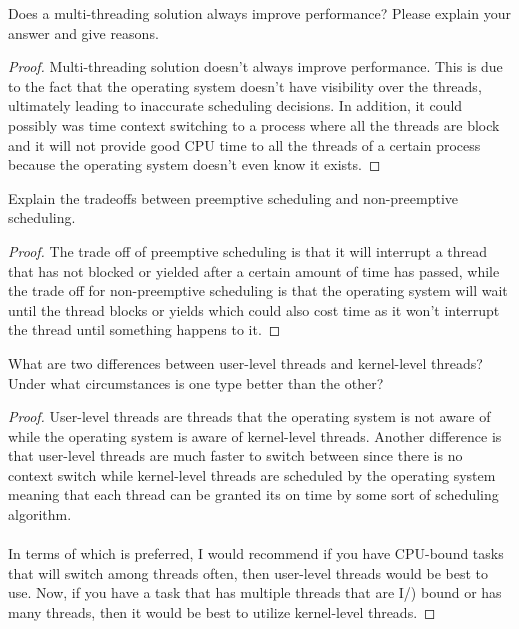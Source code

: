 \documentclass[12pt]{article}
\newenvironment{exercise}[2][Exercise]{\begin{trivlist}
\item[\hskip \labelsep {\bfseries #1}\hskip \labelsep {\bfseries #2.}]}{\end{trivlist}}
\begin{document}
\begin{exercise}{7}
Does a multi-threading solution always improve performance? Please explain your answer and give reasons.
\end{exercise}

\begin{proof}
Multi-threading solution doesn't always improve performance. This is due to the fact that the operating system doesn't have visibility over the threads, ultimately leading to inaccurate scheduling decisions. In addition, it could possibly was time context switching to a process where all the threads are block and it will not provide good CPU time to all the threads of a certain process because the operating system doesn't even know it exists. 
\end{proof}

\begin{exercise}{8}
Explain the tradeoffs between preemptive scheduling and non-preemptive scheduling.
\end{exercise}

\begin{proof}
The trade off of preemptive scheduling is that it will interrupt a thread that has not blocked or yielded after a certain amount of time has passed, while the trade off for non-preemptive scheduling is that the operating system will wait until the thread blocks or yields which could also cost time as it won't interrupt the thread until something happens to it.
\end{proof}

\begin{exercise}{9}
What are two differences between user-level threads and kernel-level threads? Under what circumstances is one type better than the other?
\end{exercise}

\begin{proof}
User-level threads are threads that the operating system is not aware of while the operating system is aware of kernel-level threads. Another difference is that user-level threads are much faster to switch between since there is no context switch while kernel-level threads are scheduled by the operating system meaning that each thread can be granted its on time by some sort of scheduling algorithm. \\ \\
In terms of which is preferred, I would recommend if you have CPU-bound tasks that will switch among threads often, then user-level threads would be best to use. Now, if you have a task that has multiple threads that are I/) bound or has many threads, then it would be best to utilize kernel-level threads. 
\end{proof}
\end{document}
